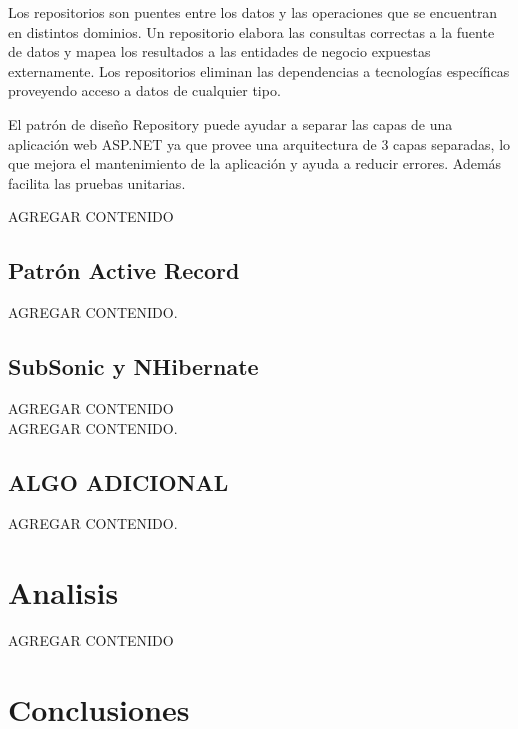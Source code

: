\documentclass[preprint,12pt]{elsarticle}
\begin{document}
Los repositorios son puentes entre los datos y las operaciones que se encuentran en distintos dominios. Un repositorio elabora las consultas correctas a la fuente de datos y mapea los resultados a las entidades de negocio expuestas externamente. Los repositorios eliminan las dependencias a tecnologías específicas proveyendo acceso a datos de cualquier tipo.\cite{referenciaQuispe1}

El patrón de diseño Repository puede ayudar a separar las capas de una aplicación web ASP.NET ya que provee una arquitectura de 3 capas separadas, lo que mejora el mantenimiento de la aplicación y ayuda a reducir errores. Además facilita las pruebas unitarias.


AGREGAR CONTENIDO \cite{referenciaQuispe1}

\subsection{Patrón Active Record}
AGREGAR CONTENIDO.\cite{referenciaQuispe1}

\subsection{SubSonic y NHibernate}
AGREGAR CONTENIDO\cite{referenciaQuispe2}
\\
AGREGAR CONTENIDO.\cite{referenciarobles2}



\subsection{ALGO ADICIONAL}

AGREGAR CONTENIDO.\cite{referenciaporlles1}




\section{Analisis}

AGREGAR CONTENIDO



\section{Conclusiones}
\end{document}
